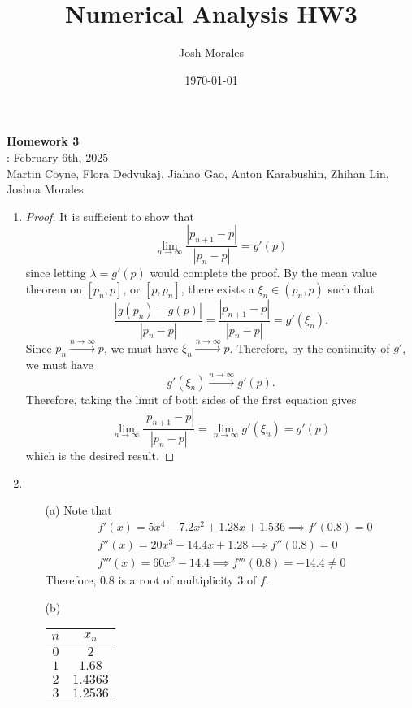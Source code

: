 \documentclass[12pt]{article}
\title{Numerical Analysis HW3}
\author{Josh Morales}
\date{\today}
\begin{document}
\pagestyle{fancy}
\begin{center}
\textbf{\Large Homework 3} \\
: February 6th, 2025\\
Martin Coyne, Flora Dedvukaj, Jiahao Gao, Anton Karabushin, Zhihan Lin, Joshua Morales
\end{center}
\begin{enumerate}[leftmargin=2em]
    \item
	\begin{proof}
	  It is sufficient to show that 
	  \[\lim_{n\to \infty}\frac{|p_{n+1}-p|}{|p_{n}-p|}=g'(p)\]
	  since letting $\lambda = g'(p)$ would complete the proof. By the mean value theorem on $[p_n,p]$, or $[p,p_n]$, there exists a $\xi_n\in (p_n,p)$ such that
	   \[
		 \frac{|g(p_n)-g(p)|}{|p_n-p|}=\frac{|p_{n+1}-p|}{|p_{n}-p|}= g'(\xi_n)
	  .\] 
	  Since $p_n \xrightarrow{n\to \infty} p$, we must have	$\xi_{n}\xrightarrow{n\to \infty} p$. Therefore, by the continuity of $g'$, we must have 
	  \[g'(\xi_n)\xrightarrow{n\to \infty} g'(p).\] 
	  Therefore, taking the limit of both sides of the first equation gives
	  \[\lim_{n\to \infty } \frac{|p_{n+1}-p|}{|p_{n}-p|}=\lim_{n\to \infty} g'(\xi_n)=g'(p)\]
	  which is the desired result.
	\end{proof}
    \item 
    \begin{enumerate}
        \item[(a)] Note that
		  \begin{align*}
			&f'(x)=5x^4-7.2x^2+1.28x+1.536 \implies 	f'(0.8)=0\\
			&f''(x) = 20x^3-14.4 x+1.28 \implies f''(0.8) = 0\\
			&f'''(x)=60x^2-14.4 \implies f'''(0.8)=-14.4\neq 0
		  \end{align*}
        Therefore, $0.8$ is a root of multiplicity $3$ of $f$.
	  \item[(b)]\phantom{a}
		  	\begin{center}
		    \begin{tabular}{|c|c|}
		  	\hline
			$n$ & $x_n$\\
			\hline
			$0$ & $2$\\
			\hline
			$1$ & $1.68$\\
			\hline
			$2$ & $1.4363$\\
			\hline
			$3$ & $1.2536$\\

\end{tabular}
\end{center}
\end{enumerate}
\end{enumerate}
\end{document}
